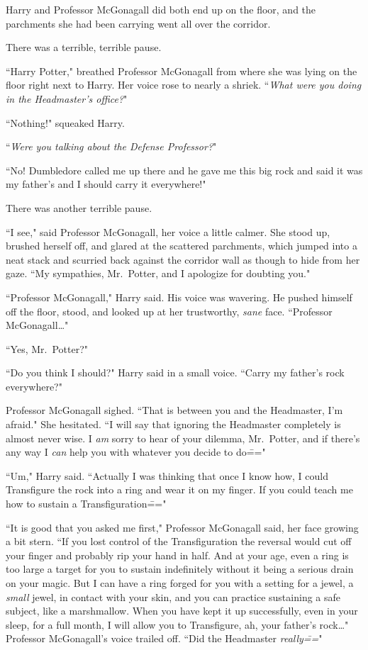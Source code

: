 Harry and Professor McGonagall did both end up on the floor, and the parchments she had been carrying went all over the corridor.

There was a terrible, terrible pause.

``Harry Potter," breathed Professor McGonagall from where she was lying on the floor right next to Harry. Her voice rose to nearly a shriek. ``\emph{What were you doing in the Headmaster's office?}"

``Nothing!" squeaked Harry.

``\emph{Were you talking about the Defense Professor?}"

``No! Dumbledore called me up there and he gave me this big rock and said it was my father's and I should carry it everywhere!"

There was another terrible pause.

``I see," said Professor McGonagall, her voice a little calmer. She stood up, brushed herself off, and glared at the scattered parchments, which jumped into a neat stack and scurried back against the corridor wall as though to hide from her gaze. ``My sympathies, Mr.~Potter, and I apologize for doubting you."

``Professor McGonagall," Harry said. His voice was wavering. He pushed himself off the floor, stood, and looked up at her trustworthy, \emph{sane} face. ``Professor McGonagall{\ldots}"

``Yes, Mr.~Potter?"

``Do you think I should?" Harry said in a small voice. ``Carry my father's rock everywhere?"

Professor McGonagall sighed. ``That is between you and the Headmaster, I'm afraid." She hesitated. ``I will say that ignoring the Headmaster completely is almost never wise. I \emph{am} sorry to hear of your dilemma, Mr.~Potter, and if there's any way I \emph{can} help you with whatever you decide to do\==="

``Um," Harry said. ``Actually I was thinking that once I know how, I could Transfigure the rock into a ring and wear it on my finger. If you could teach me how to sustain a Transfiguration\==="

``It is good that you asked me first," Professor McGonagall said, her face growing a bit stern. ``If you lost control of the Transfiguration the reversal would cut off your finger and probably rip your hand in half. And at your age, even a ring is too large a target for you to sustain indefinitely without it being a serious drain on your magic. But I can have a ring forged for you with a setting for a jewel, a \emph{small} jewel, in contact with your skin, and you can practice sustaining a safe subject, like a marshmallow. When you have kept it up successfully, even in your sleep, for a full month, I will allow you to Transfigure, ah, your father's rock{\ldots}" Professor McGonagall's voice trailed off. ``Did the Headmaster \emph{really\===}"


